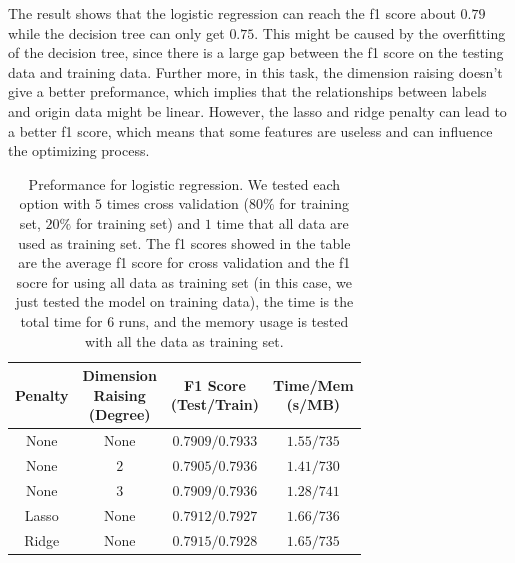 \documentclass[11pt]{article}
\begin{document}
The result shows that the logistic regression can reach the f1 score about $0.79$ while the decision tree can only get $0.75$. This might be caused by the overfitting of the decision tree, since there is a large gap between the f1 score on the testing data and training data. Further more, in this task, the dimension raising doesn't give a better preformance, which implies that the relationships between labels and origin data might be linear. However, the lasso and ridge penalty can lead to a better f1 score, which means that some features are useless and can influence the optimizing process.

\begin{table}[H]
  \centering
  \begin{tabular}{|c|c|c|c|}
    \hline
    Penalty & \makecell{Dimension                                \\ Raising \\ (Degree)} & \makecell{F1 Score \\ (Test/Train)} & \makecell{Time/Mem \\ (s/MB)} \\
    \hline
    None    & None                & $0.7909/0.7933$ & $1.55/735$ \\
    \hline
    None    & $2$                 & $0.7905/0.7936$ & $1.41/730$ \\
    \hline
    None    & $3$                 & $0.7909/0.7936$ & $1.28/741$ \\
    \hline
    Lasso   & None                & $0.7912/0.7927$ & $1.66/736$ \\
    \hline
    Ridge   & None                & $0.7915/0.7928$ & $1.65/735$ \\
    \hline
  \end{tabular}
  \caption{Preformance for logistic regression. We tested each option with $5$ times cross validation ($80\%$ for training set, $20\%$ for training set) and $1$ time that all data are used as training set. The f1 scores showed in the table are the average f1 score for cross validation and the f1 socre for using all data as training set (in this case, we just tested the model on training data), the time is the total time for $6$ runs, and the memory usage is tested with all the data as training set.}
  \label{task-1-result-1}
\end{table}
\end{document}
